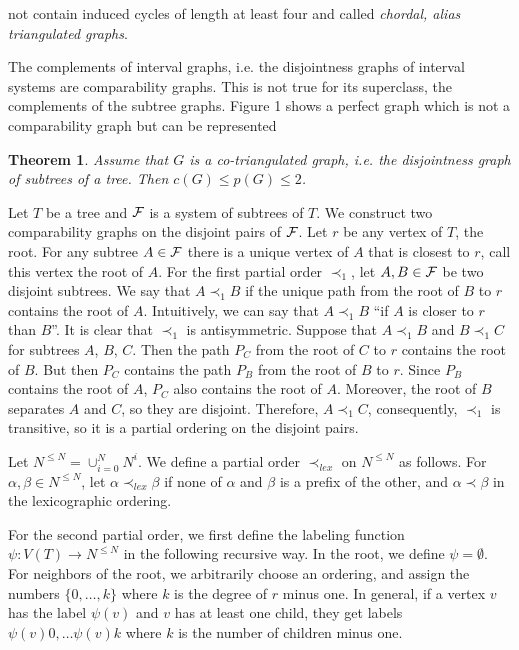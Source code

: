 \documentclass[12pt]{article}
\newtheorem{theorem}{Theorem}%
\begin{document}
not contain induced cycles of length at least four and called {\em chordal, alias triangulated graphs}.

The complements of interval graphs, i.e. the disjointness graphs of interval systems are comparability graphs.
This is not true for its superclass, the complements  of the subtree graphs.
Figure 1 shows a perfect graph which is not a comparability graph but can be represented

\begin{theorem} \label{co-triangulated}
  Assume that $G$ is a co-triangulated graph,
  i.e. the disjoint\-ness graph of subtrees of a tree. Then $c(G)\le p(G)\le 2$.
\end{theorem}

 Let $T$ be a tree and $\cal{F}$ is a system of subtrees of $T$.
We construct two comparability graphs on the disjoint pairs of $\cal{F}$.
 Let $r$ be any vertex of $T$, the root. For any subtree $A\in {\cal{F}}$
there is a unique vertex of $A$ that is closest to $r$, call this vertex the root
of $A$.
For the first partial order $\prec_1$,
let $A,B\in {\cal{F}}$
be two disjoint subtrees. We say that
$A\prec_1 B$ if the unique path from the root of $B$ to $r$ contains the root of $A$. Intuitively,
we can say that $A\prec_1 B$ ``if $A$ is closer to $r$ than $B$''.
It is clear that $\prec_1$ is antisymmetric. Suppose that  $A\prec_1 B$ and  $B\prec_1 C$ for subtrees $A$, $B$, $C$.
Then the path $P_C$ from the root of $C$ to $r$ contains the root of $B$. But then $P_C$ contains the path $P_B$
from the root of $B$ to $r$. Since $P_B$ contains the root of $A$, $P_C$ also contains
the root of $A$. Moreover, the root of $B$ separates $A$ and $C$, so they are disjoint.
Therefore, $A\prec_1 C$, consequently, $\prec_1$ is transitive, so it is
a partial ordering on the disjoint pairs.


Let $N^{\le N}=\cup_{i=0}^NN^i$. We define a partial order $\prec_{lex}$ on $N^{\le N}$ as follows.
For $\alpha, \beta\in N^{\le N}$, let $\alpha\prec_{lex}\beta$ if none of $\alpha$ and $\beta$ is a prefix of the other,  and
$\alpha\prec\beta$ in the lexicographic ordering.

For the second partial order, we first define the labeling function $\psi : V(T) \rightarrow N^{\le N}$
in the following recursive way. In the root, we define $\psi= \emptyset$. For neighbors
of the root, we arbitrarily choose an ordering, and assign the numbers
$\{0,\ldots, k\}$
where $k$ is the degree of $r$ minus one.  In general, if a vertex $v$ has the label $\psi(v)$
and $v$ has at least one child, they get labels $\psi(v)0, \dots \psi(v)k$ where $k$ is the number of children minus one.
\end{document}
